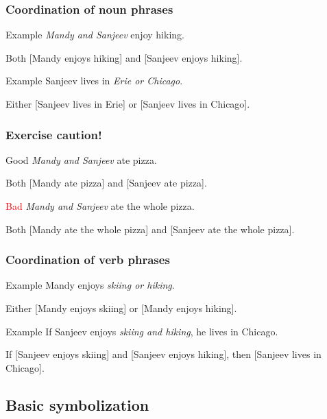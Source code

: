 \begin{frame}
  \frametitle{Coordination of noun phrases}

  \begin{block}{Example}
    \emph{Mandy and Sanjeev} enjoy hiking.

    Both [Mandy enjoys hiking] and [Sanjeev enjoys hiking].
  \end{block}

  \begin{block}{Example}
    Sanjeev lives in \emph{Erie or Chicago}.

    Either [Sanjeev lives in Erie] or [Sanjeev lives in Chicago].
  \end{block}

\end{frame}

\begin{frame}
  \frametitle{Exercise caution!}

  \begin{block}{Good}
    \emph{Mandy and Sanjeev} ate pizza.

    Both [Mandy ate pizza] and [Sanjeev ate pizza].
  \end{block}

  \begin{block}{\textcolor{red}{Bad}}
    \emph{Mandy and Sanjeev} ate the whole pizza.

    Both [Mandy ate the whole pizza] and [Sanjeev ate the whole pizza].
  \end{block}

\end{frame}

\begin{frame}
  \frametitle{Coordination of verb phrases}

  \begin{block}{Example}
  Mandy enjoys \emph{skiing or hiking}.

  Either [Mandy enjoys skiing] or [Mandy enjoys hiking].
  \end{block}

  \begin{block}{Example}
  If Sanjeev enjoys \emph{skiing and hiking}, he lives in Chicago.

  If [Sanjeev enjoys skiing] and [Sanjeev enjoys hiking], then [Sanjeev lives in Chicago].
  \end{block}

\end{frame}

\subsection{Basic symbolization}

